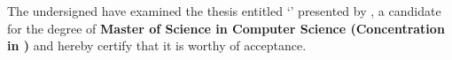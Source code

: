 The undersigned have examined the thesis entitled `\textbf{\paperTitle}' presented by \textbf{\paperAuthor}, a candidate for the degree of \textbf{Master of Science in Computer Science (Concentration in \authorConcentration)} and hereby certify that it is worthy of acceptance.

